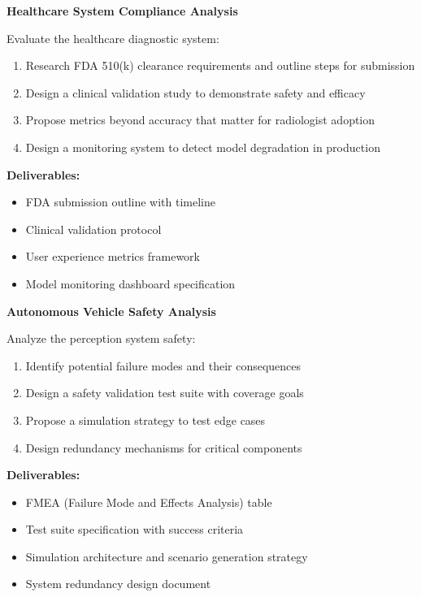 \begin{exercise}
\textbf{Healthcare System Compliance Analysis}

Evaluate the healthcare diagnostic system:

\begin{enumerate}
    \item Research FDA 510(k) clearance requirements and outline steps for submission
    \item Design a clinical validation study to demonstrate safety and efficacy
    \item Propose metrics beyond accuracy that matter for radiologist adoption
    \item Design a monitoring system to detect model degradation in production
\end{enumerate}

\textbf{Deliverables:}
\begin{itemize}
    \item FDA submission outline with timeline
    \item Clinical validation protocol
    \item User experience metrics framework
    \item Model monitoring dashboard specification
\end{itemize}
\end{exercise}

\begin{exercise}
\textbf{Autonomous Vehicle Safety Analysis}

Analyze the perception system safety:

\begin{enumerate}
    \item Identify potential failure modes and their consequences
    \item Design a safety validation test suite with coverage goals
    \item Propose a simulation strategy to test edge cases
    \item Design redundancy mechanisms for critical components
\end{enumerate}

\textbf{Deliverables:}
\begin{itemize}
    \item FMEA (Failure Mode and Effects Analysis) table
    \item Test suite specification with success criteria
    \item Simulation architecture and scenario generation strategy
    \item System redundancy design document
\end{itemize}
\end{exercise}
